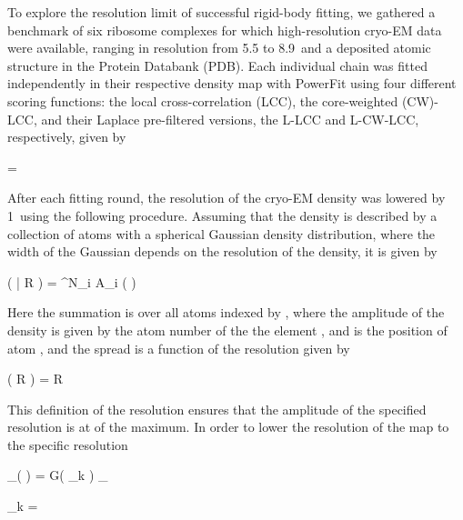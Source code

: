 

To explore the resolution limit of successful rigid-body fitting, we gathered a
benchmark of six ribosome complexes for which high-resolution cryo-EM data were
available, ranging in resolution from 5.5 to 8.9\Angstrom\, and a deposited
atomic structure in the Protein Databank (PDB). Each individual chain was
fitted independently in their respective density map with PowerFit using four
different scoring functions: the local cross-correlation (LCC), the
core-weighted (CW)-LCC, and their Laplace pre-filtered versions, the L-LCC and
L-CW-LCC, respectively, given by

\startformula
{} =  
\stopformula

After each fitting round, the resolution of the cryo-EM density was lowered by
1\Angstrom\ using the following procedure.  Assuming that the density is
described by a collection of atoms with a spherical Gaussian density
distribution, where the width of the Gaussian depends on the resolution of the
density, it is given by

\placeformula[eq:density]
\startformula
\rho \left( | R \right) = \sum^N_i A_i \exp\left(  \right)
\stopformula

Here the summation is over all  atoms indexed by , where the
amplitude of the density is given by the atom number of the the element
, and  is the position of atom , and the spread
 is a function of the resolution  given by

\startformula
\sigma\left( R \right) =  R
\stopformula

This definition of the resolution ensures that the amplitude of the specified resolution is at  of the maximum. In order to lower the resolution of the map to the specific resolution

\startformula
\rho_{}\left(  \right) = G\left( \sigma_k \right) \ast \rho_{}
\stopformula

\startformula
\sigma_k = 
\stopformula





